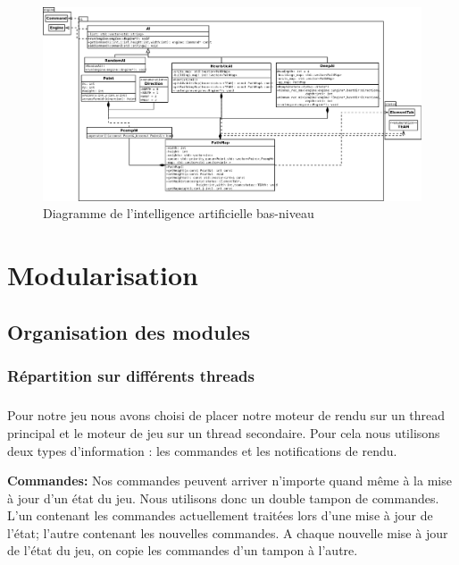 \documentclass[12pt]{report}
\begin{document}
    \newpage
\thispagestyle{empty}
\begin{landscape}
\begin{figure}[h]
    \begin{center}
    \includegraphics[scale=0.4]{ai.png}
    \end{center}
    \caption{Diagramme de l'intelligence artificielle bas-niveau}
\end{figure}
\end{landscape}
\newpage

\chapter{Modularisation}
\section{Organisation des modules}
\subsection{Répartition sur différents threads}

\paragraph{}Pour notre jeu nous avons choisi de placer notre moteur de rendu sur un thread principal et le moteur de jeu sur un thread secondaire. Pour cela nous utilisons deux types d'information : les commandes et les notifications de rendu.

\paragraphe{}\textbf{Commandes:} Nos commandes peuvent arriver n'importe quand même à la mise à jour d'un état du jeu. Nous utilisons donc un double tampon de commandes. L'un contenant les commandes actuellement traitées lors d'une mise à jour de l'état; l'autre contenant les nouvelles commandes. A chaque nouvelle mise à jour de l’état du jeu, on copie les commandes d’un tampon à l’autre. 
\end{document}
